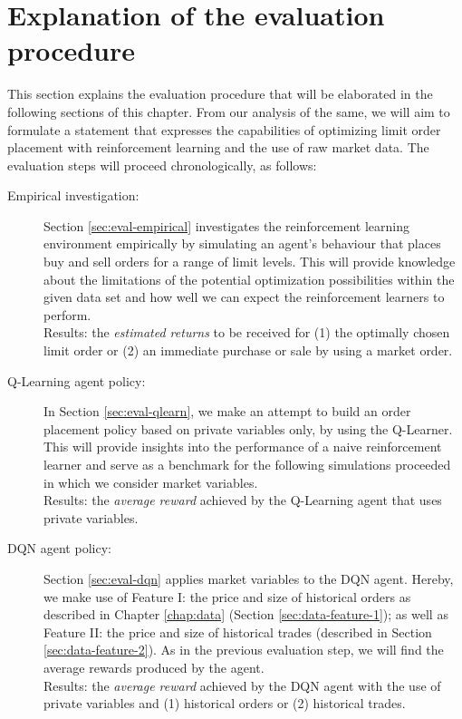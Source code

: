 \section{Explanation of the evaluation procedure}
This section explains the evaluation procedure that will be elaborated in the following sections of this chapter. From our analysis of the same, we will aim to formulate a statement that expresses the capabilities of optimizing limit order placement with reinforcement learning and the use of raw market data.
The evaluation steps will proceed chronologically, as follows:
\begin{description}
    \item[Empirical investigation: ]
    Section \ref{sec:eval-empirical} investigates the reinforcement learning environment empirically by simulating an agent's behaviour that places buy and sell orders for a range of limit levels.
    This will provide knowledge about the limitations of the potential optimization possibilities within the given data set and how well we can expect the reinforcement learners to perform.
    \\
    Results: the \textit{estimated returns} to be received for (1) the optimally chosen limit order or (2) an immediate purchase or sale by using a market order.
    
    \item[Q-Learning agent policy: ]
    In Section \ref{sec:eval-qlearn}, we make an attempt to build an order placement policy based on private variables only, by using the Q-Learner.
    This will provide insights into the performance of a naive reinforcement learner and serve as a benchmark for the following simulations proceeded in which we consider market variables.
    \\
    Results: the \textit{average reward} achieved by the Q-Learning agent that uses private variables.

    \item[DQN agent policy: ]
    Section \ref{sec:eval-dqn} applies market variables to the DQN agent.
    Hereby, we make use of Feature I: the price and size of historical orders as described in Chapter \ref{chap:data} (Section \ref{sec:data-feature-1}); as well as Feature II: the price and size of historical trades (described in Section \ref{sec:data-feature-2}).
    As in the previous evaluation step, we will find the average rewards produced by the agent.
    \\
    Results: the \textit{average reward} achieved by the DQN agent with the use of private variables and (1) historical orders or (2) historical trades.


\end{description}
